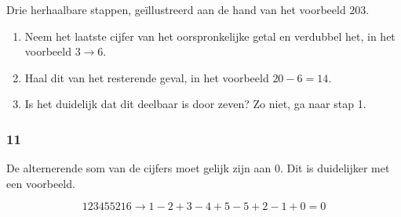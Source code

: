 \documentclass[10pt,hidelinks]{article}
\begin{document}
Drie herhaalbare stappen, ge\"illustreerd aan de hand van het voorbeeld 203.

\begin{enumerate}
	\item Neem het laatste cijfer van het oorspronkelijke getal en verdubbel het, in het voorbeeld $3 \to 6$.
	\item Haal dit van het resterende geval, in het voorbeeld $20 - 6 = 14$.
	\item Is het duidelijk dat dit deelbaar is door zeven? Zo niet, ga naar stap 1.
\end{enumerate}

\subsubsection{11}

De alternerende som van de cijfers moet gelijk zijn aan 0. Dit is duidelijker met een voorbeeld.

\[123455216 \to 1 - 2 + 3 - 4 + 5 - 5 + 2 - 1 + 0 = 0\]
\end{document}
